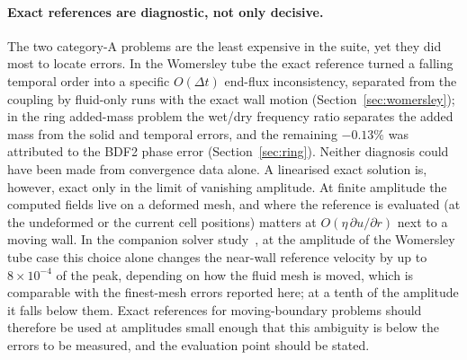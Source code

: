 \paragraph{Exact references are diagnostic, not only decisive.}
The two category-A problems are the least expensive in the suite, yet they did most to locate errors.
In the Womersley tube the exact reference turned a falling temporal order into a specific $O(\Delta t)$ end-flux inconsistency, separated from the coupling by fluid-only runs with the exact wall motion (Section~\ref{sec:womersley}); in the ring added-mass problem the wet/dry frequency ratio separates the added mass from the solid and temporal errors, and the remaining $-0.13\%$ was attributed to the BDF2 phase error (Section~\ref{sec:ring}).
Neither diagnosis could have been made from convergence data alone.
A linearised exact solution is, however, exact only in the limit of vanishing amplitude.
At finite amplitude the computed fields live on a deformed mesh, and where the reference is evaluated (at the undeformed or the current cell positions) matters at $O(\eta\,\partial u/\partial r)$ next to a moving wall.
In the companion solver study~\citep{CardiffBatistic2026QM}, at the amplitude of the Womersley tube case this choice alone changes the near-wall reference velocity by up to $8\times10^{-4}$ of the peak, depending on how the fluid mesh is moved, which is comparable with the finest-mesh errors reported here; at a tenth of the amplitude it falls below them.
Exact references for moving-boundary problems should therefore be used at amplitudes small enough that this ambiguity is below the errors to be measured, and the evaluation point should be stated.

